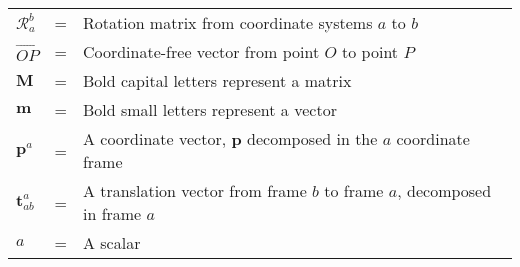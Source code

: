 \noindent 
\begin{center}
	\begin{tabular}{ l c l }
		$\mathcal{R}_a^b$ & = & Rotation matrix from coordinate systems $a$ to $b$\\
		$\overrightarrow{OP}$ & = & Coordinate-free vector from point $O$ to point $P$\\
		$\mathbf{M}$ & = & Bold capital letters represent a matrix\\
		$\mathbf{m}$ & = & Bold small letters represent a vector\\
		$\mathbf{p}^a$ & = & A coordinate vector, $\mathbf{p}$ decomposed in the $a$ coordinate frame\\
		$\mathbf{t}_{ab}^a$ & = & A translation vector from frame $b$ to frame $a$, decomposed in frame $a$\\
		$a$ & = & A scalar
	\end{tabular}
\end{center}
\cleardoublepage

\pagestyle{fancy}
\fancyhf{}
\renewcommand{\chaptermark}[1]{\markboth{\chaptername\ \thechapter.\ #1}{}}
\renewcommand{\sectionmark}[1]{\markright{\thesection\ #1}}
\renewcommand{\headrulewidth}{0.1ex}
\renewcommand{\footrulewidth}{0.1ex}
\fancyfoot[LE,RO]{\thepage}
\fancyhead[LE]{\leftmark}
\fancyhead[RO]{\rightmark}
\fancypagestyle{plain}{\fancyhf{}\fancyfoot[LE,RO]{\thepage}\renewcommand{\headrulewidth}{0ex}}

\setcounter{page}{1}